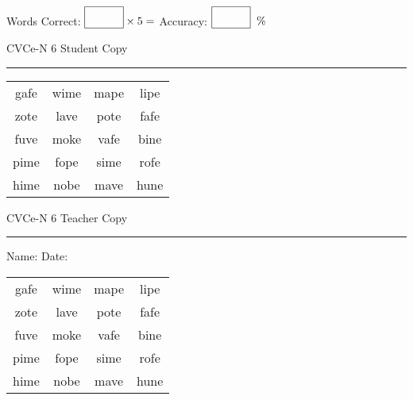 \documentclass{memoir}
\begin{document}
\small

Words Correct: $\fbox{\phantom{\huge 100}} \times 5 = $ Accuracy: $\fbox{\phantom{\huge 100}}\;\; \%$ 

\vfill

\newpage


\footnotesize \noindent
CVCe-N 6 \hfill Student Copy
\smallskip
\hrule

\Large

\setlength{\tabcolsep}{14pt}
\def\arraystretch{2}

{\selectfont


\begin{vplace}[0.5]
\begin{center}
\begin{tabular}{cccc}
gafe & wime & mape & lipe \\
zote & lave & pote & fafe \\
fuve & moke & vafe & bine \\
pime & fope & sime & rofe \\
hime & nobe & mave & hune \\
\end{tabular}
\end{center}
\end{vplace}

}

\newpage

\footnotesize \noindent
CVCe-N 6 \hfill Teacher Copy
\smallskip
\hrule

\small

\vfill

\noindent
Name: \underline{\hspace{1.75in}} \hfill Date: \underline{\hspace{1in}}

\Large

{\selectfont


\begin{vplace}[0.5]
\begin{center}
\begin{tabular}{cccc}
gafe & wime & mape & lipe \\
zote & lave & pote & fafe \\
fuve & moke & vafe & bine \\
pime & fope & sime & rofe \\
hime & nobe & mave & hune \\
\end{tabular}
\end{center}
\end{vplace}



}
\end{document}
